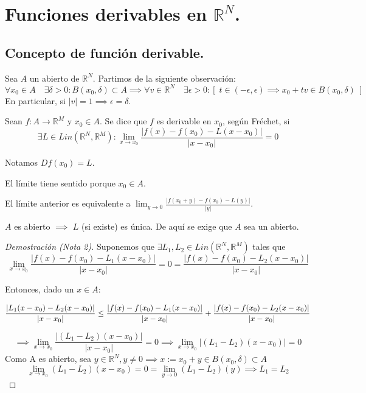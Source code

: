 \section{Funciones derivables en $\mathbb{R}^N$.}
\subsection{Concepto de función derivable.}

Sea $A$ un abierto de $\mathbb{R}^N$. Partimos de la siguiente observación:
\[
	\forall x_0 \in A\quad \exists \delta >0 : B(x_0, \delta) \subset A \implies \forall v \in \mathbb{R}^N\quad \exists \epsilon > 0 : [\; t \in (-\epsilon, \epsilon) \implies x_0+tv\in B(x_0,\delta)\;]
\]
 En particular, si $|v| = 1 \implies \epsilon = \delta$.

\begin{ndef} Sean $f : A \longrightarrow \mathbb{R}^M$ y $x_0\in A$. Se dice que $f$ es derivable en $x_0$, según Fréchet, si
\[
	\exists L\in Lin(\mathbb{R}^N, \mathbb{R}^M) : \lim_{x\to x_0} \frac{|f(x)-f(x_0)- L(x-x_0)|}{|x-x_0|} =0
\]

Notamos $Df(x_0) = L$.
\end{ndef}

\begin{nota}[1]\hfill
	\begin{nlist}
		\item El límite tiene sentido porque $x_0\in A$.
		\item El límite anterior es equivalente a $\lim_{y\to 0} \frac{|f(x_0+y)-f(x_0)-L(y)|}{|y|}$.
	\end{nlist}
\end{nota}

\begin{nota}[2]
	$A$ es abierto $\implies$ $L$ (si existe) es única. De aquí se exige que $A$ sea un abierto.
\end{nota}

\begin{proof}[Demostración (Nota 2)]
	Suponemos que $\exists L_1,L_2\in Lin(\mathbb{R}^N, \mathbb{R}^M)$ tales que
\[
\lim_{x\to x_0} \frac{|f(x)-f(x_0)- L_1(x-x_0)|}{|x-x_0|} =0= \frac{|f(x)-f(x_0)- L_2(x-x_0)|}{|x-x_0|}
\]

Entonces, dado un $x\in A$:

\begin{align}
	\frac{|L_1(x-x_0) - L_2(x-x_0)|}{|x-x_0|} \le \frac{|f(x)-f(x_0)- L_1(x-x_0)|}{|x-x_0|} + \frac{|f(x)-f(x_0)- L_2(x-x_0)|}{|x-x_0|}\notag
\end{align}

\[
\implies \lim_{x\to x_0} \frac{|(L_1-L_2)(x-x_0)|}{|x-x_0|} = 0 \implies \lim_{x\to x_0}|(L_1 -L_2)(x-x_0)|=0
\]
Como A es abierto, sea $y \in \mathbb{R}^N, y \neq 0 \implies x:=x_0+y \in B(x_0, \delta) \subset A$\\
$$\lim_{x\to x_0}(L_1-L_2)(x-x_0)=0=\lim_{y\to 0}(L_1-L_2)(y)\implies L_1=L_2$$
\end{proof}

